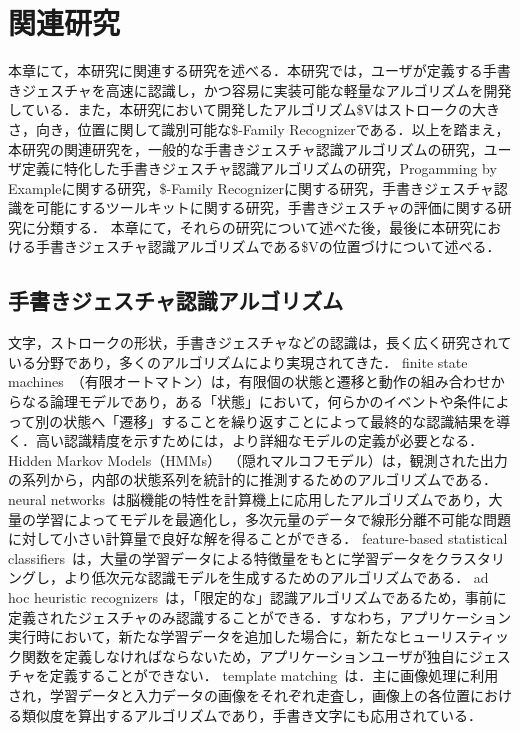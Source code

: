 \chapter{関連研究}
本章にて，本研究に関連する研究を述べる．本研究では，ユーザが定義する手書きジェスチャを高速に認識し，かつ容易に実装可能な軽量なアルゴリズムを開発している．また，本研究において開発したアルゴリズム\$Vはストロークの大きさ，向き，位置に関して識別可能な\$-Family Recognizerである．以上を踏まえ，本研究の関連研究を，一般的な手書きジェスチャ認識アルゴリズムの研究，ユーザ定義に特化した手書きジェスチャ認識アルゴリズムの研究，Progamming by Exampleに関する研究，\$-Family Recognizerに関する研究，手書きジェスチャ認識を可能にするツールキットに関する研究，手書きジェスチャの評価に関する研究に分類する．
本章にて，それらの研究について述べた後，最後に本研究における手書きジェスチャ認識アルゴリズムである\$Vの位置づけについて述べる．

\section{手書きジェスチャ認識アルゴリズム}
文字，ストロークの形状，手書きジェスチャなどの認識は，長く広く研究されている分野であり，多くのアルゴリズムにより実現されてきた．
finite state machines~\cite{Hong00constructingfinite}（有限オートマトン）は，有限個の状態と遷移と動作の組み合わせからなる論理モデルであり，ある「状態」において，何らかのイベントや条件によって別の状態へ「遷移」することを繰り返すことによって最終的な認識結果を導く．高い認識精度を示すためには，より詳細なモデルの定義が必要となる．
Hidden Markov Models（HMMs）~\cite{Anderson2004HiddenMM,Sezgin:2005:HES:1040830.1040899, Cao:2005:EOA:1089508.1089540}（隠れマルコフモデル）は，観測された出力の系列から，内部の状態系列を統計的に推測するためのアルゴリズムである．
neural networks~\cite{Pittman:1991:RHT:108844.108914}は脳機能の特性を計算機上に応用したアルゴリズムであり，大量の学習によってモデルを最適化し，多次元量のデータで線形分離不可能な問題に対して小さい計算量で良好な解を得ることができる．
feature-based statistical classifiers~\cite{Cho:2006:NGR:1711617.1711649,Rubine:1991:SGE:127719.122753}は，大量の学習データによる特徴量をもとに学習データをクラスタリングし，より低次元な認識モデルを生成するためのアルゴリズムである．
ad hoc heuristic recognizers~\cite{Anthony:2010:LMR:1839214.1839258, Wilson:2003:XUI:642611.642706}は，「限定的な」認識アルゴリズムであるため，事前に定義されたジェスチャのみ認識することができる．すなわち，アプリケーション実行時において，新たな学習データを追加した場合に，新たなヒューリスティック関数を定義しなければならないため，アプリケーションユーザが独自にジェスチャを定義することができない．
template matching~\cite{Kara:2005:ITS:1652319.1652712, Kristensson:2004:SLV:1029632.1029640}は．主に画像処理に利用され，学習データと入力データの画像をそれぞれ走査し，画像上の各位置における類似度を算出するアルゴリズムであり，手書き文字にも応用されている．

